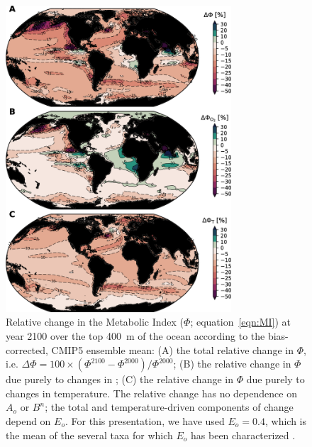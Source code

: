 \documentclass{report_chapter}
\begin{document}
\begin{figure}[p]
\centering
\includegraphics[width=0.75\textwidth]{metabolic-index-change-map.png}
\caption{Relative change in the Metabolic Index ($\Phi$; equation~\ref{eqn:MI}) at year 2100 over the top 400~m of the ocean according to the bias-corrected, CMIP5 ensemble mean:
(A) the total relative change in $\Phi$, i.e. ${\Delta\Phi = 100\times(\Phi^{2100}-\Phi^{2000})/\Phi^{2000}}$; (B) the relative change in $\Phi$ due purely to changes in \OO{}; (C) the relative change in $\Phi$ due purely to changes in temperature.
The relative change has no dependence on $A_o$ or $B^n$; the total and temperature-driven components of change depend on $E_o$.
For this presentation, we have used $E_o = 0.4$, which is the mean of the several taxa for which $E_o$ has been characterized \citep{Deutsch-Ferrel-etal-2015}.
}
\label{fig:MI-change-map}
\end{figure}
\end{document}
